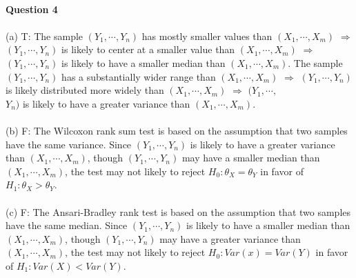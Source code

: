 \documentclass[12pt,a4paper]{article}
\begin{document}
~\\
\indent \textbf{Question 4}\\
~\\
(a) T: The sample $(Y_{1},\cdots,Y_{n})$ has mostly smaller values than $(X_{1},\cdots,X_{m})$ $\Rightarrow$ $(Y_{1},\cdots,Y_{n})$ is likely to center at a smaller value than $(X_{1},\cdots,X_{m})$ $\Rightarrow$ $(Y_{1},\cdots,Y_{n})$ is likely to have a smaller median than $(X_{1},\cdots,X_{m})$. The sample $(Y_{1},\cdots,Y_{n})$ has a substantially wider range than $(X_{1},\cdots,X_{m})$ $\Rightarrow$ $(Y_{1},\cdots,Y_{n})$ is likely distributed more widely than $(X_{1},\cdots,X_{m})$ $\Rightarrow$ $(Y_{1},\cdots,$\\$Y_{n})$ is likely to have a greater variance than $(X_{1},\cdots,X_{m})$.\\
~\\
(b) F: The Wilcoxon rank sum test is based on the assumption that two samples have the same variance. Since $(Y_{1},\cdots,Y_{n})$ is likely to have a greater variance than $(X_{1},\cdots,X_{m})$, though $(Y_{1},\cdots,Y_{n})$ may have a smaller median than $(X_{1},\cdots,X_{m})$, the test may not likely to reject $H_{0}:\theta_{X}=\theta_{Y}$ in favor of $H_{1}:\theta_{X}>\theta_{Y}$.\\
~\\
(c) F: The Ansari-Bradley rank test is based on the assumption that two samples have the same median. Since $(Y_{1},\cdots,Y_{n})$ is likely to have a smaller median than $(X_{1},\cdots,X_{m})$, though $(Y_{1},\cdots,Y_{n})$ may have a greater variance than $(X_{1},\cdots,X_{m})$, the test may not likely to reject $H_{0}: Var(x)=Var(Y)$ in favor of $H_{1}:Var(X)<Var(Y)$.
\end{document}
